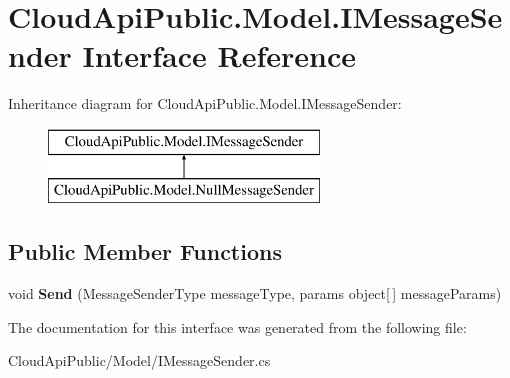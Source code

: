 \hypertarget{interface_cloud_api_public_1_1_model_1_1_i_message_sender}{\section{Cloud\-Api\-Public.\-Model.\-I\-Message\-Sender Interface Reference}
\label{interface_cloud_api_public_1_1_model_1_1_i_message_sender}
}
Inheritance diagram for Cloud\-Api\-Public.\-Model.\-I\-Message\-Sender\-:\begin{figure}[H]
\begin{center}
\leavevmode
\includegraphics[height=2.000000cm]{interface_cloud_api_public_1_1_model_1_1_i_message_sender}
\end{center}
\end{figure}
\subsection*{Public Member Functions}
\begin{DoxyCompactItemize}
\item 
\hypertarget{interface_cloud_api_public_1_1_model_1_1_i_message_sender_a7b67bf8e8a241a2601f988d05ec7b587}{void {\bfseries Send} (Message\-Sender\-Type message\-Type, params object\mbox{[}$\,$\mbox{]} message\-Params)}\label{interface_cloud_api_public_1_1_model_1_1_i_message_sender_a7b67bf8e8a241a2601f988d05ec7b587}

\end{DoxyCompactItemize}


The documentation for this interface was generated from the following file\-:\begin{DoxyCompactItemize}
\item 
Cloud\-Api\-Public/\-Model/I\-Message\-Sender.\-cs\end{DoxyCompactItemize}

